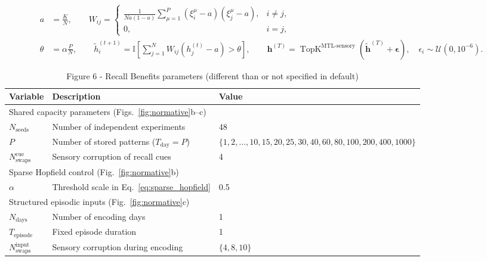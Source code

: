 \documentclass{article}
\begin{document}
\begin{equation}
\label{eq:sparse_hopfield}
\begin{aligned}
a &= \frac{K}{N}, \qquad
W_{ij} =
\begin{cases}
\displaystyle
\frac{1}{Na(1-a)}
\sum_{\mu=1}^{P}
\left(\xi_i^\mu-a\right)\left(\xi_j^\mu-a\right),
& i\neq j,\\
0, & i=j,
\end{cases}
\\
\theta &= \alpha\frac{P}{N}, \qquad
\tilde h_i^{(t+1)}
= \mathbb{I}\!\left[
\sum_{j=1}^{N} W_{ij}\left(h_j^{(t)}-a\right)>\theta
\right],
\qquad
\mathbf{h}^{(T)}
= \operatorname{TopK}^{\textrm{MTL-sensory}}\!\left(
\tilde{\mathbf{h}}^{(T)}+\boldsymbol{\epsilon}
\right),
\quad
\epsilon_i\sim\mathcal{U}(0,10^{-6}).
\end{aligned}
\end{equation}
\begin{table}[h!]
\centering
\caption{Figure 6 - Recall Benefits parameters (different than or not specified in default)}
\label{tab:figure_6A}
\begin{tabular}{lll}
\toprule
\textbf{Variable} & \textbf{Description} & \textbf{Value} \\
\midrule
\multicolumn{3}{l}{Shared capacity parameters (Figs.~\ref{fig:normative}b--c)} \\
$N_{\textrm{seeds}}$ & Number of independent experiments & 48 \\
$P$ & Number of stored patterns ($T_{\textrm{day}}=P$) & $\{1,2,\ldots,10,15,20,25,30,40,60,80,100,200,400,1000\}$ \\
$N_{\textrm{swaps}}^{\textrm{cue}}$ & Sensory corruption of recall cues & 4 \\
\midrule
\multicolumn{3}{l}{Sparse Hopfield control (Fig.~\ref{fig:normative}b)} \\
$\alpha$ & Threshold scale in Eq.~\ref{eq:sparse_hopfield} & 0.5 \\
\midrule
\multicolumn{3}{l}{Structured episodic inputs (Fig.~\ref{fig:normative}c)} \\
$N_{\textrm{days}}$ & Number of encoding days & 1 \\
$T_{\textrm{episode}}$ & Fixed episode duration & 1 \\
$N_{\textrm{swaps}}^{\textrm{input}}$ & Sensory corruption during encoding & $\{4,8,10\}$ \\
\bottomrule
\end{tabular}
\end{table}
\end{document}
